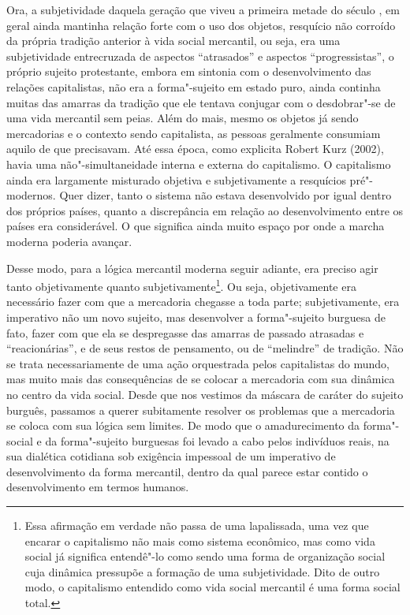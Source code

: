 Ora, a subjetividade daquela geração que viveu a primeira metade do
século , em geral ainda mantinha relação forte com o uso dos objetos,
resquício não corroído da própria tradição anterior à vida social
mercantil, ou seja, era uma subjetividade entrecruzada de aspectos
``atrasados'' e aspectos ``progressistas'', o próprio sujeito
protestante, embora em sintonia com o desenvolvimento das relações
capitalistas, não era a forma"-sujeito em estado puro, ainda continha
muitas das amarras da tradição que ele tentava conjugar com o
desdobrar"-se de uma vida mercantil sem peias. Além do mais, mesmo os
objetos já sendo mercadorias e o contexto sendo capitalista, as pessoas
geralmente consumiam aquilo de que precisavam. Até essa época, como
explicita Robert Kurz (2002), havia uma não"-simultaneidade interna e
externa do capitalismo. O capitalismo ainda era largamente misturado
objetiva e subjetivamente a resquícios pré"-modernos. Quer dizer, tanto o
sistema não estava desenvolvido por igual dentro dos próprios países,
quanto a discrepância em relação ao desenvolvimento entre os países era
considerável. O que significa ainda muito espaço por onde a marcha
moderna poderia avançar.

Desse modo, para a lógica mercantil moderna seguir adiante, era preciso
agir tanto objetivamente quanto subjetivamente\footnote{Essa afirmação
  em verdade não passa de uma lapalissada, uma vez que encarar o
  capitalismo não mais como sistema econômico, mas como vida social já significa
  entendê"-lo como sendo uma forma de organização social cuja dinâmica
  pressupõe a formação de uma subjetividade. Dito de outro modo, o
  capitalismo entendido como vida social mercantil é uma forma social
  total.}. Ou seja, objetivamente era necessário fazer com que a
mercadoria chegasse a toda parte; subjetivamente, era imperativo não um
novo sujeito, mas desenvolver a forma"-sujeito burguesa de fato, fazer
com que ela se despregasse das amarras de passado atrasadas e
``reacionárias'', e de seus restos de pensamento, ou de ``melindre'' de
tradição. Não se trata necessariamente de uma ação orquestrada pelos
capitalistas do mundo, mas muito mais das consequências de se colocar a
mercadoria com sua dinâmica no centro da vida social. Desde que nos
vestimos da máscara de caráter do sujeito burguês, passamos a querer
subitamente resolver os problemas que a mercadoria se coloca com sua
lógica sem limites. De modo que o amadurecimento da forma"-social e da
forma"-sujeito burguesas foi levado a cabo pelos indivíduos reais, na sua
dialética cotidiana sob exigência impessoal de um imperativo de
desenvolvimento da forma mercantil, dentro da qual parece estar contido
o desenvolvimento em termos humanos.


